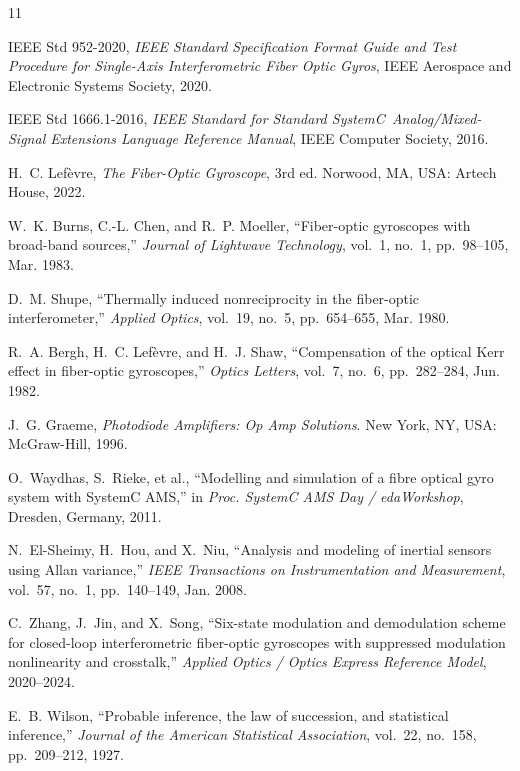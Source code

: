 \documentclass[11pt, a4paper]{article}
\begin{document}
\begin{thebibliography}{11}

IEEE Std 952-2020, \emph{IEEE Standard Specification Format Guide and Test Procedure for Single-Axis Interferometric Fiber Optic Gyros}, IEEE Aerospace and Electronic Systems Society, 2020.

IEEE Std 1666.1-2016, \emph{IEEE Standard for Standard SystemC\textregistered\ Analog/Mixed-Signal Extensions Language Reference Manual}, IEEE Computer Society, 2016.

H.~C. Lefèvre, \emph{The Fiber-Optic Gyroscope}, 3rd ed. Norwood, MA, USA: Artech House, 2022.

W.~K. Burns, C.-L. Chen, and R.~P. Moeller, ``Fiber-optic gyroscopes with broad-band sources,'' \emph{Journal of Lightwave Technology}, vol.~1, no.~1, pp.~98--105, Mar. 1983.

D.~M. Shupe, ``Thermally induced nonreciprocity in the fiber-optic interferometer,'' \emph{Applied Optics}, vol.~19, no.~5, pp.~654--655, Mar. 1980.

R.~A. Bergh, H.~C. Lefèvre, and H.~J. Shaw, ``Compensation of the optical Kerr effect in fiber-optic gyroscopes,'' \emph{Optics Letters}, vol.~7, no.~6, pp.~282--284, Jun. 1982.

J.~G. Graeme, \emph{Photodiode Amplifiers: Op Amp Solutions}. New York, NY, USA: McGraw-Hill, 1996.

O.~Waydhas, S.~Rieke, et al., ``Modelling and simulation of a fibre optical gyro system with SystemC AMS,'' in \emph{Proc. SystemC AMS Day / edaWorkshop}, Dresden, Germany, 2011.

N.~El-Sheimy, H.~Hou, and X.~Niu, ``Analysis and modeling of inertial sensors using Allan variance,'' \emph{IEEE Transactions on Instrumentation and Measurement}, vol.~57, no.~1, pp.~140--149, Jan. 2008.

C.~Zhang, J.~Jin, and X.~Song, ``Six-state modulation and demodulation scheme for closed-loop interferometric fiber-optic gyroscopes with suppressed modulation nonlinearity and crosstalk,'' \emph{Applied Optics / Optics Express Reference Model}, 2020--2024.

E.~B. Wilson, ``Probable inference, the law of succession, and statistical inference,'' \emph{Journal of the American Statistical Association}, vol.~22, no.~158, pp.~209--212, 1927.

\end{thebibliography}
\end{document}
